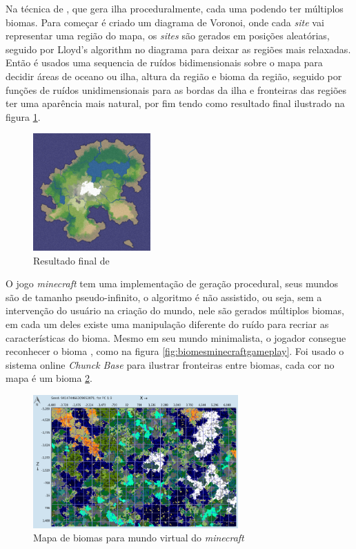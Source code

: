 Na técnica de \cite{patel2010polygonal}, que gera ilha proceduralmente, cada uma podendo ter
múltiplos biomas. Para começar é criado um diagrama de Voronoi, onde cada \textit{site}
vai representar uma região do mapa, os \textit{sites} são gerados em posições
aleatórias, seguido por Lloyd's algorithm no diagrama para
deixar as regiões mais relaxadas.
Então é usados uma sequencia de ruídos bidimensionais sobre o mapa para decidir
áreas de oceano ou ilha, altura da região e bioma da região, seguido por funções
de ruídos unidimensionais para as bordas da ilha e fronteiras das regiões ter
uma aparência mais natural, por fim tendo como resultado final ilustrado na
figura \ref{fig:voronoi-map-goal-distorted}.
\begin{figure}[H]
    \centering
    \includegraphics[width=0.4\textwidth]{figuras/voronoi-map-goal-distorted.png}
    \caption{Resultado final de \cite{patel2010polygonal}}
    \label{fig:voronoi-map-goal-distorted}
\end{figure}

O jogo \textit{minecraft} tem uma implementação de geração procedural,
seus mundos são de tamanho pseudo-infinito, 
o algoritmo é não assistido, ou seja, sem a intervenção
do usuário na criação do mundo, nele
são gerados múltiplos biomas, em cada um deles existe uma manipulação diferente
do ruído para recriar as características do bioma. Mesmo em seu mundo
minimalista, o jogador consegue reconhecer o bioma \cite{short2012teaching},
como na figura \ref{fig:biomesminecraftgameplay}.
Foi usado o sistema online \textit{Chunck Base} para 
ilustrar fronteiras entre biomas, cada cor no mapa é um bioma \ref{fig:chunkbasebiomes}.


\begin{figure}[H]
    \centering
    \includegraphics[width=0.7\textwidth]{figuras/chunkbasebiomes.png}
    \caption{Mapa de biomas para mundo virtual do \textit{minecraft}}
    \label{fig:chunkbasebiomes}
\end{figure}

